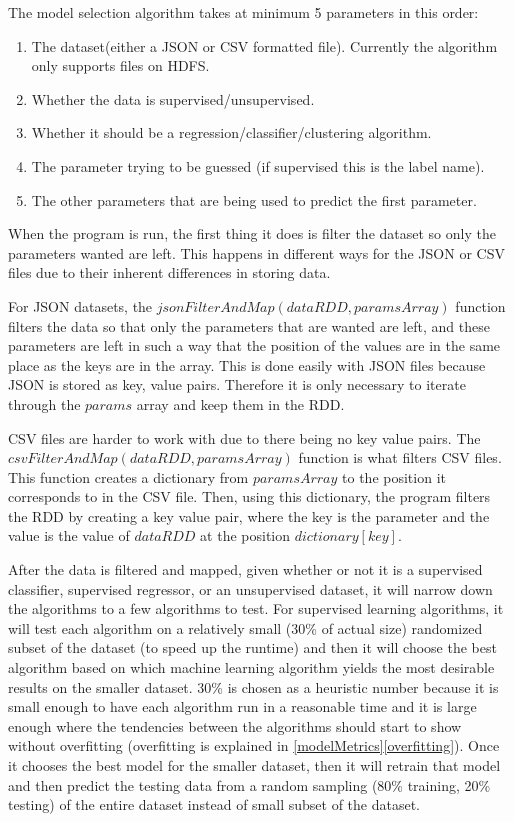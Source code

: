 \documentclass[9pt,twocolumn,twoside]{idsi}
\begin{document}
The model selection algorithm takes at minimum 5 parameters in this order: 
\begin{enumerate}
\item The dataset(either a JSON or CSV formatted file). Currently the algorithm only supports files on HDFS.
\item Whether the data is supervised/unsupervised.
\item Whether it should be a regression/classifier/clustering algorithm.
\item The parameter trying to be guessed (if supervised this is the label name).
\item The other parameters that are being used to predict the first parameter.
\end{enumerate}

When the program is run, the first thing it does is filter the dataset so only the parameters wanted are left. This happens in different ways for the JSON or CSV files due to their inherent differences in storing data.

For JSON datasets, the $jsonFilterAndMap(dataRDD, paramsArray)$ function filters the data so that only the parameters that are wanted are left, and these parameters are left in such a way that the position of the values are in the same place as the keys are in the array. This is done easily with JSON files because JSON is stored as key, value pairs. Therefore it is only necessary to iterate through the $params$ array and keep them in the RDD.


CSV files are harder to work with due to there being no key value pairs. The $csvFilterAndMap(dataRDD, paramsArray)$ function is what filters CSV files. This function creates a dictionary from $paramsArray$ to the position it corresponds to in the CSV file. Then, using this dictionary, the program filters the RDD by creating a key value pair, where the key is the parameter and the value is the value of $dataRDD$ at the position $dictionary[key]$.

After the data is filtered and mapped, given whether or not it is a supervised classifier, supervised regressor, or an unsupervised dataset, it will narrow down the algorithms to a few algorithms to test. For supervised learning algorithms, it will test each algorithm on a relatively small (30\% of actual size) randomized subset of the dataset (to speed up the runtime) and then it will choose the best algorithm  based on which machine learning algorithm  yields the most desirable results on the smaller dataset. 30\% is chosen as a heuristic number because it is small enough to have each algorithm run in a reasonable time and it is large enough where the tendencies between the algorithms should start to show without overfitting (overfitting is explained in \ref{modelMetrics}\ref{overfitting}). Once it chooses the best model for the smaller dataset, then it will retrain that model and then predict the testing data from a random sampling (80\% training, 20\% testing) of the entire dataset instead of small subset of the dataset.
\end{document}
